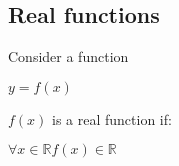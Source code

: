 
\subsection{Real functions}

Consider a function

$y=f(x)$

\(f(x)\) is a real function if:

\(\forall x\in \mathbb{R} f(x) \in \mathbb{R}\)



